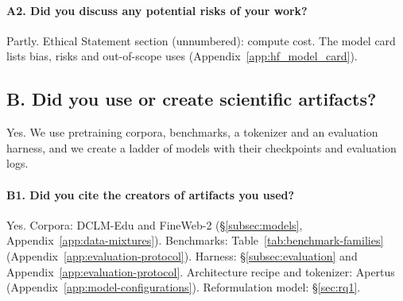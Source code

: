 \paragraph{A2. Did you discuss any potential risks of your work?}
Partly. Ethical Statement section (unnumbered): compute cost. The model card lists bias, risks and out-of-scope uses (Appendix~\ref{app:hf_model_card}).

\subsection*{B. Did you use or create scientific artifacts?}
Yes. We use pretraining corpora, benchmarks, a tokenizer and an evaluation harness, and we create a ladder of models with their checkpoints and evaluation logs.

\paragraph{B1. Did you cite the creators of artifacts you used?}
Yes. Corpora: DCLM-Edu and FineWeb-2 (\S\ref{subsec:models}, Appendix~\ref{app:data-mixtures}). Benchmarks: Table~\ref{tab:benchmark-families} (Appendix~\ref{app:evaluation-protocol}). Harness: \S\ref{subsec:evaluation} and Appendix~\ref{app:evaluation-protocol}. Architecture recipe and tokenizer: Apertus (Appendix~\ref{app:model-configurations}). Reformulation model: \S\ref{sec:rq1}.

